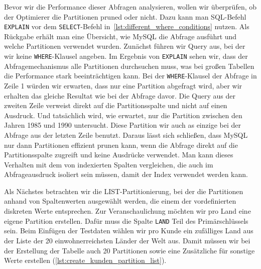 Bevor wir die Performance dieser Abfragen analysieren, wollen wir überprüfen, ob der Optimierer die Partitionen pruned oder nicht.
Dazu kann man SQL-Befehl \texttt{EXPLAIN} vor dem \texttt{SELECT}-Befehl in~\ref{lst:different_where_conditions} nutzen.
Als Rückgabe erhält man eine Übersicht, wie MySQL die Abfrage ausführt und welche Partitionen verwendet wurden.
Zunächst führen wir Query aus, bei der wir keine \texttt{WHERE}-Klausel angeben.
Im Ergebnis von \texttt{EXPLAIN} sehen wir, dass der Abfragemechanismus alle Partitionen durchsuchen muss, was bei großen Tabellen die Performance stark beeinträchtigen kann.
Bei der \texttt{WHERE}-Klausel der Abfrage in Zeile 1 würden wir erwarten, dass nur eine Partition abgefragt wird, aber wir erhalten das gleiche Resultat wie bei der Abfrage davor.
Die Query aus der zweiten Zeile verweist direkt auf die Partitionsspalte und nicht auf einen Ausdruck.
Und tatsächlich wird, wie erwartet, nur die Partition zwischen den Jahren 1985 und 1990 untersucht.
Diese Partition wir auch as einzige bei der Abfrage aus der letzten Zeile benutzt.
Daraus lässt sich schließen, dass MySQL nur dann Partitionen effizient prunen kann, wenn die Abfrage direkt auf die Partitionsspalte zugreift und keine Ausdrücke verwendet.
Man kann dieses Verhalten mit dem von indexierten Spalten vergleichen, die auch im Abfrageausdruck isoliert sein müssen, damit der Index verwendet werden kann.

Als Nächstes betrachten wir die LIST-Partitionierung, bei der die Partitionen anhand von Spaltenwerten ausgewählt werden, die einem der vordefinierten diskreten Werte entsprechen.
Zur Veranschaulichung möchten wir pro Land eine eigene Partition erstellen.
Dafür muss die Spalte \texttt{LAND} Teil des Primärschlüssels sein.
Beim Einfügen der Testdaten wählen wir pro Kunde ein zufälliges Land aus der Liste der 20 einwohnerreichsten Länder der Welt aus.
Damit müssen wir bei der Erstellung der Tabelle auch 20 Partitionen sowie eine Zusätzliche für sonstige Werte erstellen (\ref{lst:create_kunden_partition_list}).

\vspace{-5pt}

\vspace{-5pt}

